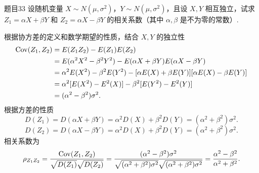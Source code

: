 \begin{question}{题目33}
    设随机变量 $X \sim N(\mu, \sigma^2)$，$Y \sim N(\mu, \sigma^2)$，且设 $X,Y$ 相互独立，试求 $Z_1 = \alpha X + \beta Y$ 和 $Z_2 = \alpha X - \beta Y$ 的相关系数（其中 $\alpha, \beta$ 是不为零的常数）.
\end{question}
\begin{solution}
    根据协方差的定义和数学期望的性质，结合 $X,Y$ 的独立性
    $$
        \begin{aligned}
            \operatorname{Cov}(Z_1, Z_2)
             & = E(Z_1Z_2) - E(Z_1)E(Z_2)                                                              \\
             & = E(\alpha^2X^2-\beta^2Y^2) - E(\alpha X + \beta Y)E(\alpha X - \beta Y)                \\
             & = \alpha^2E(X^2) - \beta^2E(Y^2) - [\alpha E(X) + \beta E(Y)][\alpha E(X) - \beta E(Y)] \\
             & = \alpha^2[E(X^2)-E^2(X)] - \beta^2 [E(Y^2)-E^2(Y)]                                     \\
             & = (\alpha^2 - \beta^2)\sigma^2.                                                         \\
        \end{aligned}
    $$
    根据方差的性质
    $$
        D(Z_1) = D(\alpha X + \beta Y)
        = \alpha^2D(X) + \beta^2D(Y)
        = (\alpha^2+\beta^2)\sigma^2.
    $$
    $$
        D(Z_2) = D(\alpha X - \beta Y)
        = \alpha^2D(X) + \beta^2D(Y)
        = (\alpha^2+\beta^2)\sigma^2.
    $$
    相关系数为
    $$
        \rho_{Z_1Z_2} = \frac{\operatorname{Cov}(Z_1, Z_2)}{\sqrt{D(Z_1)}\sqrt{D(Z_2)}}
        = \frac{(\alpha^2 - \beta^2)\sigma^2}{\sqrt{(\alpha^2+\beta^2)\sigma^2}\sqrt{(\alpha^2+\beta^2)\sigma^2}}
        = \frac{\alpha^2-\beta^2}{\alpha^2+\beta^2}.
    $$
\end{solution}

\newpage